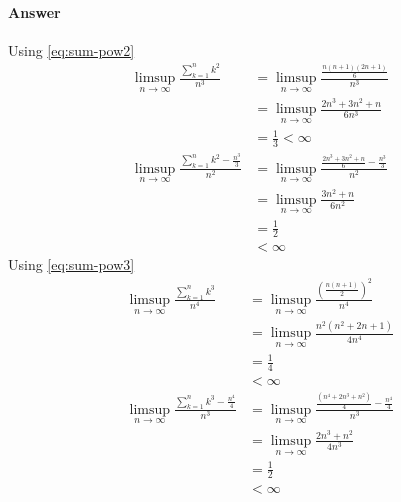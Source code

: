 \paragraph{Answer}
Using \eqref{eq:sum-pow2}
\begin{align*}
    \limsup_{n \rightarrow \infty} \frac{\sum_{k=1}^{n} k^2}{n^3} &= \limsup_{n \rightarrow \infty} \frac{\frac{n (n + 1) (2 n + 1)}{6}}{n^3} \\
                                                                  &= \limsup_{n \rightarrow \infty} \frac{2 n^3 + 3 n^2 + n}{6 n^3} \\
                                                                  &= \frac{1}{3} < \infty \\
    \limsup_{n \rightarrow \infty} \frac{\sum_{k=1}^{n} k^2 - \frac{n^3}{3}}{n^2} &= \limsup_{n \rightarrow \infty} \frac{\frac{2 n^3 + 3 n^2 + n}{6} - \frac{n^3}{3}}{n^2} \\
                                                                                  &= \limsup_{n \rightarrow \infty} \frac{3 n^2 + n}{6 n^2} \\
                                                                                  &= \frac{1}{2} \\
                                                                                  &< \infty
\end{align*}
Using \eqref{eq:sum-pow3}
\begin{align*}
    \limsup_{n \rightarrow \infty} \frac{\sum_{k=1}^{n} k^3}{n^4} &= \limsup_{n \rightarrow \infty} \frac{\left( \frac{n (n + 1)}{2} \right)^2}{n^4} \\
                                                                  &= \limsup_{n \rightarrow \infty} \frac{n^2 (n^2 + 2n + 1)}{4 n^4} \\
                                                                  &= \frac{1}{4} \\
                                                                  &< \infty \\
    \limsup_{n \rightarrow \infty} \frac{\sum_{k=1}^{n} k^3 - \frac{n^4}{4}}{n^3} &= \limsup_{n \rightarrow \infty} \frac{ \frac{(n^4 + 2 n^3 + n^2)}{4} - \frac{n^4}{4}}{n^3} \\
                                                                  &= \limsup_{n \rightarrow \infty} \frac{2 n^3 + n^2}{4 n^3} \\
                                                                  &= \frac{1}{2} \\
                                                                  &< \infty
\end{align*}
